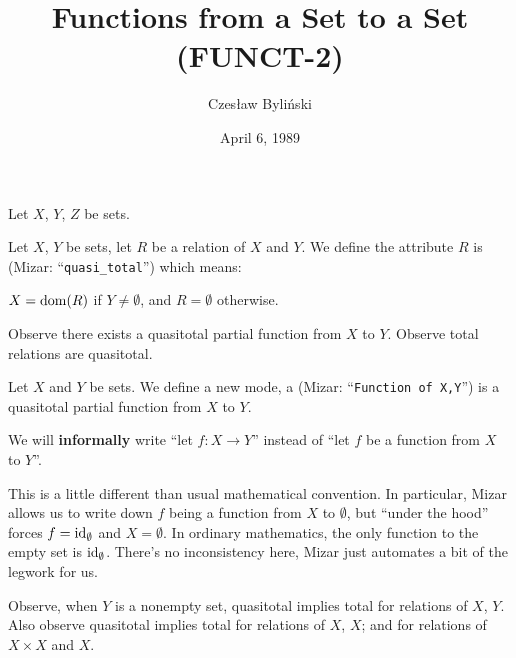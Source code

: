 \documentclass{article}
\title{Functions from a Set to a Set (FUNCT-2)}
\author{Czes{\l}aw Byli\'nski}
\date{April 6, 1989}
\begin{document}
\maketitle

Let $X$, $Y$, $Z$ be sets.
\begin{definition}
Let $X$, $Y$ be sets, let $R$ be a relation of $X$ and $Y$.
We define the attribute $R$ is  (Mizar: ``\verb#quasi_total#'')
which means:
\begin{defn}
\item $X=\operatorname{dom}(R)$ if $Y\neq\emptyset$, and $R=\emptyset$ otherwise.
\end{defn}
\end{definition}
Observe there exists a quasitotal partial function from $X$ to $Y$.
Observe total relations are quasitotal.

\begin{definition}
Let $X$ and $Y$ be sets. We define a new mode, a 
(Mizar: ``\verb#Function of X,Y#'')
is a quasitotal partial function from $X$ to $Y$.
\end{definition}

\begin{remark}
We will \textbf{informally} write ``let $f\colon X\to Y$'' instead of
``let $f$ be a function from $X$ to $Y$''.
\end{remark}

\begin{remark}
This is a little different than usual mathematical convention. In
particular, Mizar allows us to write down $f$ being a function from $X$
to $\emptyset$, but ``under the hood'' forces $f=\operatorname{id}_{\emptyset}$ and
$X=\emptyset$. In ordinary mathematics, the only function to the empty
set is $\operatorname{id}_{\emptyset}$. There's no inconsistency here, Mizar just
automates a bit of the legwork for us. 
\end{remark}
Observe, when $Y$ is a nonempty set, quasitotal implies total for
relations of $X$, $Y$. Also observe quasitotal implies total for
relations of $X$, $X$; and for relations of $X\times X$ and $X$.
\end{document}
